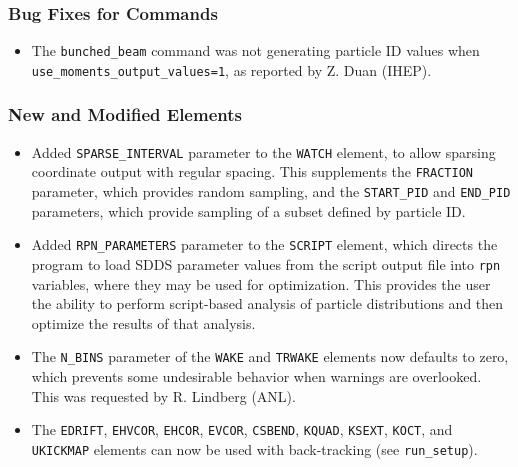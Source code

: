 \documentclass[11pt]{article}
\begin{document}
\subsubsection{Bug Fixes for Commands}
\begin{itemize}
\item The \verb|bunched_beam| command was not generating particle ID values when \verb|use_moments_output_values=1|,
  as reported by Z. Duan (IHEP). 
\end{itemize}

\subsubsection{New and Modified Elements}
\begin{itemize}
\item Added \verb|SPARSE_INTERVAL| parameter to the \verb|WATCH| element, to allow sparsing coordinate output
  with regular spacing.  This supplements the \verb|FRACTION| parameter, which provides random sampling, and the
  \verb|START_PID| and \verb|END_PID| parameters, which provide sampling of a subset defined by particle ID.
\item Added \verb|RPN_PARAMETERS| parameter to the \verb|SCRIPT| element, which directs the program to load
  SDDS parameter values from the script output file into \verb|rpn| variables, where they may be used for
  optimization. This provides the user the ability to perform script-based analysis of particle distributions and
  then optimize the results of that analysis.
\item The \verb|N_BINS| parameter of the \verb|WAKE| and \verb|TRWAKE| elements now defaults to zero, which
  prevents some undesirable behavior when warnings are overlooked. This was requested by R. Lindberg (ANL).
\item The \verb|EDRIFT|, \verb|EHVCOR|, \verb|EHCOR|, \verb|EVCOR|, \verb|CSBEND|, \verb|KQUAD|, \verb|KSEXT|, 
  \verb|KOCT|, and \verb|UKICKMAP| elements can now be used with back-tracking (see \verb|run_setup|).
\end{itemize}
\end{document}
